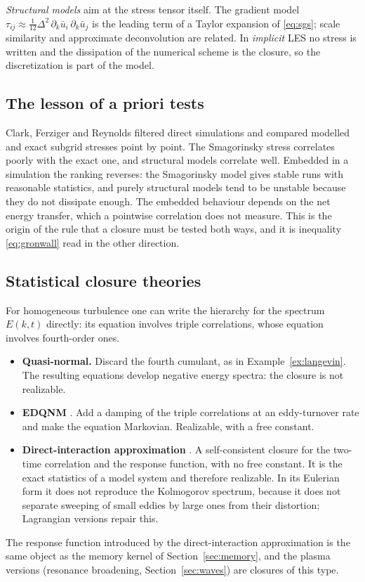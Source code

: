 \emph{Structural models} aim at the stress tensor itself. The gradient
model $\tau_{ij}\approx\tfrac1{12}\Delta^2\,\partial_k\bar u_i\,\partial_k\bar u_j$
is the leading term of a Taylor expansion of \eqref{eq:sgs}; scale
similarity and approximate deconvolution are related. In \emph{implicit}
LES no stress is written and the dissipation of the numerical scheme is the
closure, so the discretization is part of the model.

\subsection{The lesson of a priori tests}

Clark, Ferziger and Reynolds \cite{Clark79} filtered direct simulations and
compared modelled and exact subgrid stresses point by point. The
Smagorinsky stress correlates poorly with the exact one, and structural
models correlate well. Embedded in a simulation the ranking reverses: the
Smagorinsky model gives stable runs with reasonable statistics, and purely
structural models tend to be unstable because they do not dissipate enough.
The embedded behaviour depends on the net energy transfer, which a
pointwise correlation does not measure. This is the origin of the rule that
a closure must be tested both ways, and it is inequality \eqref{eq:gronwall}
read in the other direction.

\subsection{Statistical closure theories}
\label{sec:statclosure}

For homogeneous turbulence one can write the hierarchy for the spectrum
$E(k,t)$ directly: its equation involves triple correlations, whose
equation involves fourth-order ones.
\begin{itemize}
  \item \textbf{Quasi-normal.} Discard the fourth cumulant, as in
    Example~\ref{ex:langevin}. The resulting equations develop negative
    energy spectra: the closure is not realizable.
  \item \textbf{EDQNM} \cite{Orszag70}. Add a damping of the triple
    correlations at an eddy-turnover rate and make the equation Markovian.
    Realizable, with a free constant.
  \item \textbf{Direct-interaction approximation}
    \cite{Kraichnan59}. A self-consistent closure for the two-time
    correlation and the response function, with no free constant. It is the
    exact statistics of a model system and therefore realizable. In its
    Eulerian form it does not reproduce the Kolmogorov spectrum, because it
    does not separate sweeping of small eddies by large ones from their
    distortion; Lagrangian versions repair this.
\end{itemize}
The response function introduced by the direct-interaction approximation is
the same object as the memory kernel of Section~\ref{sec:memory}, and the
plasma versions (resonance broadening, Section~\ref{sec:waves}) are
closures of this type.
